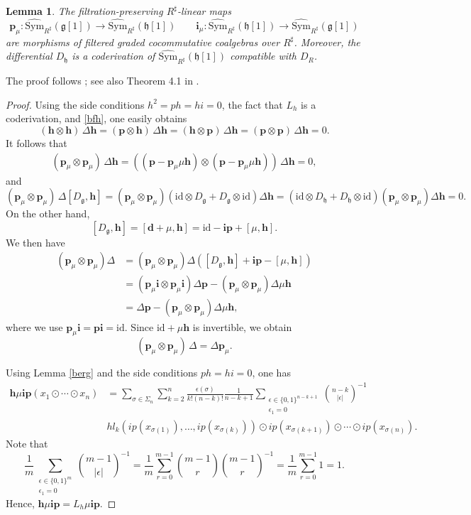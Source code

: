 \documentclass[12pt]{amsart}
\newtheorem{lem}[defn]{Lemma}
\numberwithin{equation}{section}
\theoremstyle{plain}
\newcommand{\bfd}{\mathbf{d}}
\newcommand{\bfi}{\mathbf{i}}
\newcommand{\bfh}{\mathbf{h}}
\newcommand{\bfp}{\mathbf{p}}
\newcommand{\fg}{\mathfrak{g}}
\newcommand{\fh}{\mathfrak{h}}
\newcommand{\Sym}{\mathrm{Sym}}
\newcommand{\id}{\mathrm{id}}
\newcommand{\wSym}{\widehat{\Sym}}
\newcommand{\uR}{{R^\sharp}}
\begin{document}
	\begin{lem}\label{bergetz}
		The filtration-preserving $\uR$-linear maps
		\[		
		\bfp_\mu\colon\wSym_\uR(\fg[1]) \longrightarrow \wSym_\uR(\fh[1])
		\qquad
		\bfi_\mu\colon\wSym_\uR(\fh[1]) \longrightarrow \wSym_\uR(\fg[1])
		\]
		are morphisms of filtered graded cocommutative coalgebras over $\uR$. Moreover, the differential $D_\fh$ is a coderivation of $\wSym_\uR(\fh[1])$ compatible with $D_R$.
	\end{lem}
	The proof follows \cite{berglund2014homological}; see also Theorem 4.1 in \cite{getzler2025higherholonomycurvedlinftyalgebras}.
	\begin{proof}		
		Using the side conditions $h^2=ph = hi=0$, the fact that $L_h$ is a coderivation, and  \eqref{bfh}, one easily obtains
		\[
		(\bfh \otimes \bfh)\,\Delta \bfh = (\bfp \otimes \bfh)\,\Delta \bfh = (\bfh \otimes \bfp)\,\Delta \bfh = (\bfp \otimes \bfp)\,\Delta \bfh = 0.
		\]
		It follows that
		\begin{align*}
			(\bfp_\mu \otimes \bfp_\mu)\,\Delta \bfh = ((\bfp - \bfp_\mu \mu \bfh) \otimes (\bfp - \bfp_\mu \mu \bfh))\,\Delta \bfh = 0,
		\end{align*}
		and
		\[
		 (\bfp_\mu \otimes \bfp_\mu)\,\Delta [D_\fg, \bfh]=(\bfp_\mu \otimes \bfp_\mu)(\id \otimes D_\fg + D_\fg \otimes \id) \Delta  \bfh = (\id \otimes D_\fh + D_\fh \otimes \id) (\bfp_\mu \otimes \bfp_\mu) \Delta  \bfh = 0.
		\]
		On the other hand,
		\[
		[D_\fg, \bfh] = [\bfd + \mu, \bfh] = \id - \bfi \bfp + [\mu, \bfh].
		\]
		We then have
		\begin{align*}
			(\bfp_\mu \otimes \bfp_\mu) \Delta &= (\bfp_\mu \otimes \bfp_\mu) \Delta \left([D_\fg, \bfh]  + \bfi \bfp - [\mu, \bfh]\right) \\
			&= (\bfp_\mu \bfi \otimes \bfp_\mu \bfi) \Delta \bfp  - (\bfp_\mu \otimes \bfp_\mu) \Delta \mu \bfh \\
			&=\Delta \bfp  - (\bfp_\mu \otimes \bfp_\mu) \Delta \mu \bfh,
		\end{align*}
		where we use $\bfp_\mu \bfi =  \bfp \bfi =\id$. Since $\id + \mu \bfh$ is invertible, we obtain
		\[
		(\bfp_\mu \otimes \bfp_\mu)\,\Delta = \Delta \bfp_\mu.
		\]
		
	    Using Lemma \ref{berg} and the side conditions $ph = hi = 0$,  one has
		\begin{align*}
			\bfh \mu \bfi \bfp (x_1 \odot \cdots \odot x_n) &= \sum_{\sigma \in \Sigma_n} \sum_{k=2}^n \frac{\epsilon(\sigma)}{k!(n-k)!}
			\frac{1}{n-k+1} \sum_{\substack{\epsilon \in \{0,1\}^{n-k+1}\\ \epsilon_1 =0}} \binom{n-k}{|\epsilon|}^{-1} \\
			&
			hl_k(ip(x_{\sigma(1)}),\dots,ip(x_{\sigma(k)}))
			\odot ip(x_{\sigma(k+1)}) \odot \cdots \odot ip(x_{\sigma(n)}).
		\end{align*}
		Note that
		\[
		\frac{1}{m}
		\sum_{\substack{\epsilon\in\{0,1\}^{m}\\ \epsilon_1=0}}
		\binom{m-1}{|\epsilon|}^{-1}
		=
		\frac{1}{m}
		\sum_{r=0}^{m-1}
		\binom{m-1}{r}\binom{m-1}{r}^{-1}
		=
		\frac{1}{m}\sum_{r=0}^{m-1}1
		=1.
		\]
		Hence, $\bfh \mu \bfi \bfp  = L_h \mu \bfi \bfp$.
		

\end{proof}
\end{document}
